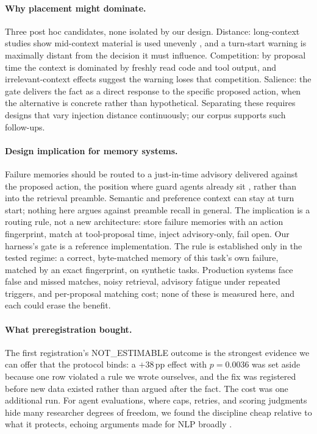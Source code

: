 \documentclass[11pt]{article}
\newcommand{\pp}{\ensuremath{\,\mathrm{pp}}}
\begin{document}
\paragraph{Why placement might dominate.}
Three post hoc candidates, none isolated by our design. Distance: long-context
studies show mid-context material is used unevenly \citep{liu2024lost}, and a
turn-start warning is maximally distant from the decision it must influence.
Competition: by proposal time the context is dominated by freshly read code
and tool output, and irrelevant-context effects \citep{shi2023distracted}
suggest the warning loses that competition. Salience: the gate delivers the
fact as a direct response to the specific proposed action, when the
alternative is concrete rather than hypothetical. Separating these requires
designs that vary injection distance continuously; our corpus supports such
follow-ups.

\paragraph{Design implication for memory systems.}
Failure memories should be routed to a just-in-time advisory delivered
against the proposed action, the position where guard agents already sit
\citep{xiang2024guardagent}, rather than into the retrieval preamble.
Semantic and preference context can stay at turn start; nothing here argues
against preamble recall in general. The implication is a routing rule, not a
new architecture: store failure memories with an action fingerprint, match at
tool-proposal time, inject advisory-only, fail open. Our harness's gate is a
reference implementation. The rule is established only in the tested regime:
a correct, byte-matched memory of this task's own failure, matched by an
exact fingerprint, on synthetic tasks. Production systems face false and
missed matches, noisy retrieval, advisory fatigue under repeated triggers,
and per-proposal matching cost; none of these is measured here, and each
could erase the benefit.

\paragraph{What preregistration bought.}
The first registration's NOT\_ESTIMABLE outcome is the strongest evidence we
can offer that the protocol binds: a $+38\pp$ effect with $p = 0.0036$ was
set aside because one row violated a rule we wrote ourselves, and the fix was
registered before new data existed rather than argued after the fact. The
cost was one additional run. For agent evaluations, where caps, retries, and
scoring judgments hide many researcher degrees of freedom, we found the
discipline cheap relative to what it protects, echoing arguments made for
NLP broadly \citep{vanmiltenburg2021preregistering, pineau2021reproducibility}.
\end{document}
